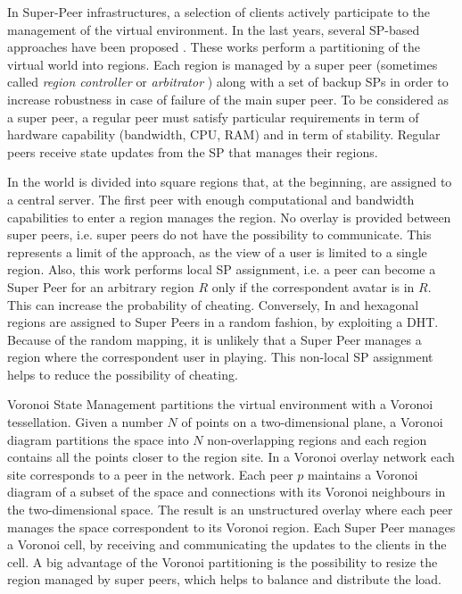 \documentclass[final,10pt,a5paper]{phdimt}
\theoremstyle{definition}
\begin{document}
In Super-Peer infrastructures, a selection of clients actively participate to the management of the virtual environment.
In the last years, several SP-based approaches have been proposed \cite{Kim2004,hu2008voronoi,Hampel2006,Vuong2005}.
These works perform a partitioning of the virtual world into regions.
Each region is managed by a super peer (sometimes called \textit{region controller} \cite{Hampel2006} or \textit{arbitrator} \cite{hu2008voronoi}) along with a set of backup SPs in order to increase robustness in case of failure of the main super peer.
To be considered as a super peer, a regular peer must satisfy particular requirements in term of hardware capability (bandwidth, CPU, RAM) and in term of stability. 
Regular peers receive state updates from the SP that manages their regions.


In \cite{Kim2004} the world is divided into square regions that, at the beginning, are assigned to a central server.
The first peer with enough computational and bandwidth capabilities to enter a region manages the region.
No overlay is provided between super peers, i.e. super peers do not have the possibility to communicate.
This represents a limit of the approach, as the view of a user is limited to a single region.
Also, this work performs local SP assignment, i.e. a peer can become a Super Peer for an arbitrary region $R$ only if the correspondent avatar is in $R$.  This can increase the probability of cheating.
Conversely, In \cite{Hampel2006} and \cite{Vuong2005} hexagonal regions are assigned to Super Peers in a random fashion, by exploiting a DHT.
Because of the random mapping, it is unlikely that a Super Peer manages a region where the correspondent user in playing.
This non-local SP assignment helps to reduce the possibility of cheating.

Voronoi State Management \cite{hu2008voronoi} partitions the virtual environment with a Voronoi tessellation.
Given a number $N$ of points on a two-dimensional plane, a Voronoi diagram partitions the space into $N$ non-overlapping regions and each region contains all the points closer to the region site. 
In a Voronoi overlay network each site corresponds to a peer in the network. 
Each peer $p$ maintains a Voronoi diagram of a subset of the space and connections with its Voronoi neighbours in the two-dimensional space.
The result is an unstructured overlay where each peer manages the space correspondent to its Voronoi region.
Each Super Peer manages a Voronoi cell, by receiving and communicating the updates to the clients in the cell.
A big advantage of the Voronoi partitioning is the possibility to resize the region managed by super peers, which helps to balance and distribute the load.
\end{document}
